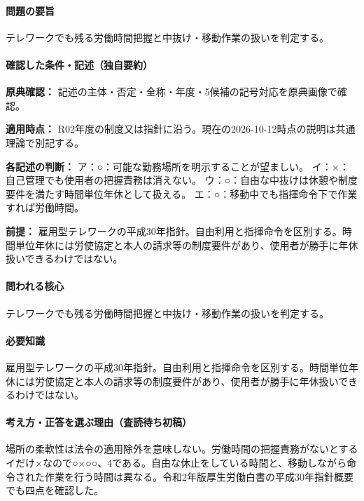 \paragraph{問題の要旨} テレワークでも残る労働時間把握と中抜け・移動作業の扱いを判定する。

\paragraph{確認した条件・記述（独自要約）}\mbox{}\par

\noindent\textbf{原典確認：} 記述の主体・否定・全称・年度・5候補の記号対応を原典画像で確認。\par

\noindent\textbf{適用時点：} R02年度の制度又は指針に沿う。現在の2026-10-12時点の説明は共通理論で別記する。\par

\noindent\textbf{各記述の判断：} ア：○：可能な勤務場所を明示することが望ましい。 イ：×：自己管理でも使用者の把握責務は消えない。 ウ：○：自由な中抜けは休憩や制度要件を満たす時間単位年休として扱える。 エ：○：移動中でも指揮命令下で作業すれば労働時間。\par

\noindent\textbf{前提：} 雇用型テレワークの平成30年指針。自由利用と指揮命令を区別する。時間単位年休には労使協定と本人の請求等の制度要件があり、使用者が勝手に年休扱いできるわけではない。\par

\paragraph{問われる核心} テレワークでも残る労働時間把握と中抜け・移動作業の扱いを判定する。

\paragraph{必要知識} 雇用型テレワークの平成30年指針。自由利用と指揮命令を区別する。時間単位年休には労使協定と本人の請求等の制度要件があり、使用者が勝手に年休扱いできるわけではない。

\paragraph{考え方・正答を選ぶ理由（査読待ち初稿）} 場所の柔軟性は法令の適用除外を意味しない。労働時間の把握責務がないとするイだけ×なので○×○○、4である。自由な休止をしている時間と、移動しながら命令された作業を行う時間は異なる。令和2年版厚生労働白書の平成30年指針概要でも四点を確認した。

